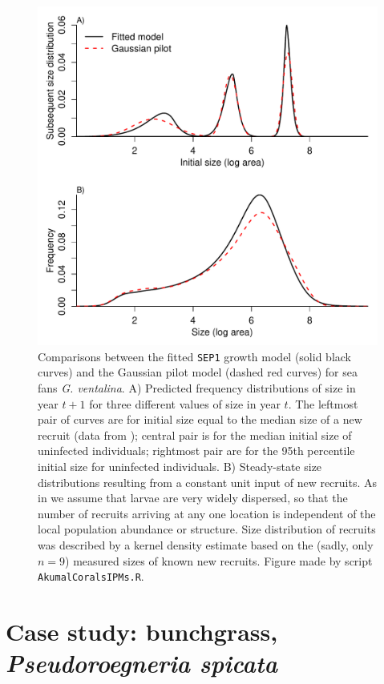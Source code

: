 \documentclass[11pt]{article}
\begin{document}
{\begin{figure}[tbp]
\centering
\includegraphics[width=.9\textwidth]{figures/CoralKernelCompare.pdf}
\caption{Comparisons between the fitted \texttt{SEP1} growth model (solid black curves) and the Gaussian pilot model (dashed red curves)
for sea fans \emph{G. ventalina}. A) Predicted frequency distributions of size in year $t+1$ for three different values of size in 
year $t$. The leftmost pair of curves are for initial size equal to the median size of a new recruit (data from \citep{bruno-etal-2011}); 
central pair is for the median initial size of uninfected individuals; rightmost pair are for the 95th percentile initial size for uninfected
individuals. B) Steady-state size distributions resulting from a constant unit input of new recruits. As in \citet{bruno-etal-2011} we
assume that larvae are very widely dispersed, so that the number of recruits arriving at any one location is independent of the local population
abundance or structure. Size distribution of recruits was described by a kernel density estimate based on the (sadly, only $n=9$) measured sizes
of known new recruits. Figure made by script \texttt{AkumalCoralsIPMs.R}.}
\label{fig:CoralKernelCompare}
\end{figure}  
 
 
 
\clearpage   

\section{Case study: bunchgrass, \emph{Pseudoroegneria spicata}}

}
\end{document}
